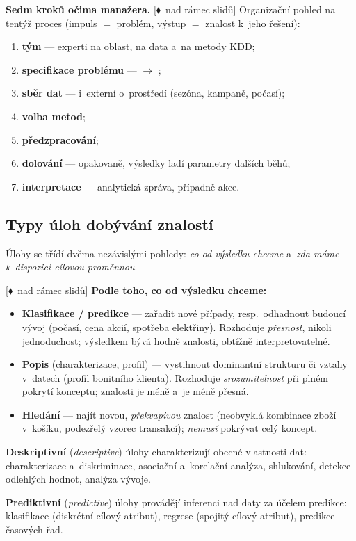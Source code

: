 \documentclass[11pt,a4paper]{article}
\theoremstyle{definition}
\newcommand{\mimo}{\textcolor{markcol}{\textsf{\footnotesize[$\blacklozenge$~nad rámec slidů]}}}
\begin{document}
\textbf{Sedm kroků očima manažera.} \mimo{} Organizační pohled na tentýž proces (impuls $=$
problém, výstup $=$ znalost k~jeho řešení):
\begin{enumerate}
\item \textbf{tým} --- experti na oblast, na data a~na metody KDD;
\item \textbf{specifikace problému} ---  $\to$ ;
\item \textbf{sběr dat} --- i~externí o~prostředí (sezóna, kampaně, počasí);
\item \textbf{volba metod};
\item \textbf{předzpracování};
\item \textbf{dolování} --- opakovaně, výsledky ladí parametry dalších běhů;
\item \textbf{interpretace} --- analytická zpráva, případně akce.
\end{enumerate}

\subsection{Typy úloh dobývání znalostí}

Úlohy se třídí dvěma nezávislými pohledy: \emph{co od výsledku chceme} a~\emph{zda máme
k~dispozici cílovou proměnnou}.

\mimo{} \textbf{Podle toho, co od výsledku chceme:}
\begin{itemize}
\item \textbf{Klasifikace / predikce} --- zařadit nové případy, resp.\ odhadnout budoucí
      vývoj (počasí, cena akcií, spotřeba elektřiny). Rozhoduje \emph{přesnost}, nikoli
      jednoduchost; výsledkem bývá hodně znalosti, obtížně interpretovatelné.
\item \textbf{Popis} (charakterizace, profil) --- vystihnout dominantní strukturu či vztahy
      v~datech (profil bonitního klienta). Rozhoduje \emph{srozumitelnost} při plném pokrytí
      konceptu; znalosti je méně a~je méně přesná.
\item \textbf{Hledání } --- najít novou, \emph{překvapivou} znalost (neobvyklá
      kombinace zboží v~košíku, podezřelý vzorec transakcí); \emph{nemusí} pokrývat celý
      koncept.
\end{itemize}

\begin{defbox}
\textbf{Deskriptivní} (\emph{descriptive}) úlohy charakterizují obecné vlastnosti dat:
charakterizace a~diskriminace, asociační a~korelační analýza, shlukování, detekce odlehlých
hodnot, analýza vývoje.

\textbf{Prediktivní} (\emph{predictive}) úlohy provádějí inferenci nad daty za účelem
predikce: klasifikace (diskrétní cílový atribut), regrese (spojitý cílový atribut),
predikce časových řad.
\end{defbox}
\end{document}
